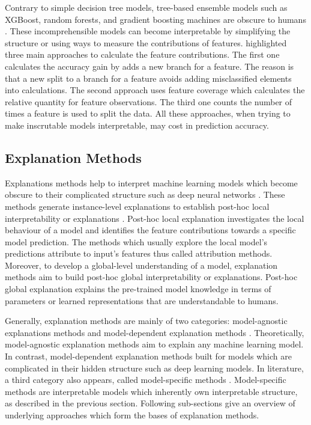 \documentclass[english]{tktltiki2}
\theoremstyle{definition}
\theoremstyle{remark}
\begin{document}

Contrary to simple decision tree models, tree-based ensemble models such as XGBoost, random forests, and gradient boosting machines are obscure to humans \citep{murdoch2019interpretable}. These incomprehensible models can become interpretable by simplifying the structure or using ways to measure the contributions of features. \citet{murdoch2019interpretable} highlighted three main approaches to calculate the feature contributions. The first one calculates the accuracy gain by adds a new branch for a feature. The reason is that a new split to a branch for a feature avoids adding misclassified elements into calculations. The second approach uses feature coverage which calculates the relative quantity for feature observations. The third one counts the number of times a feature is used to split the data. All these approaches, when trying to make inscrutable models interpretable, may cost in prediction accuracy.



\subsection{Explanation Methods}\label{sec:explanation_methods} 
Explanations methods help to interpret machine learning models which become obscure to their complicated structure such as deep neural networks \citet{bibal2016interpretability, miller2018explanation, honegger2018shedding, molnarinterpretable, guidotti2018survey, murdoch2019interpretable}. These methods generate instance-level explanations to establish post-hoc local interpretability or explanations \citet{honegger2018shedding, murdoch2019interpretable}. Post-hoc local explanation investigates the local behaviour of a model and identifies the feature contributions towards a specific model prediction. The methods which usually explore the local model’s predictions attribute to input’s features thus called attribution methods. Moreover, to develop a global-level understanding of a model, explanation methods aim to build post-hoc global interpretability or explanations. Post-hoc global explanation explains the pre-trained model knowledge in terms of parameters or learned representations that are understandable to humans\citet{murdoch2019interpretable}.

Generally, explanation methods are mainly of two categories: model-agnostic explanations methods and model-dependent explanation methods \citet{bibal2016interpretability, honegger2018shedding, molnarinterpretable}. Theoretically, model-agnostic explanation methods aim to explain any machine learning model. In contrast, model-dependent explanation methods built for models which are complicated in their hidden structure such as deep learning models. In literature, a third category also appears, called model-specific methods \citet{molnarinterpretable, murdoch2019interpretable}. Model-specific methods are interpretable models which inherently own interpretable structure, as described in the previous section. Following sub-sections give an overview of underlying approaches which form the bases of explanation methods.
\end{document}
